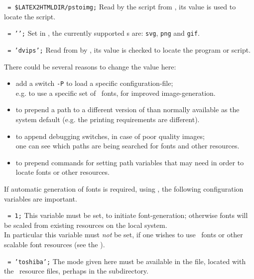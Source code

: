\begin{htmllist}
\item [\fn{\$PSTOIMG}\texttt{ = \char34\$LATEX2HTMLDIR/pstoimg\char34;}]
Read by the  \Perl{} script from , 
its value is used to locate the  \Perl{} script.

\item [\fn{\$IMAGE\_TYPE}\texttt{ = '\Meta{image-type}';}]
Set in , the currently supported s
are: \texttt{svg}, \texttt{png} and \texttt{gif}.

\item [\fn{\$DVIPS}\texttt{ = 'dvips';}]
Read from  by , 
its value is checked to locate the  program or script.

\smallskip\noindent
There could be several reasons to change the value here:
\begin{itemize}
\item
add a switch \texttt{-P} to load a specific configuration-file;\\
e.g. to use a specific set of \PS\ fonts, for improved image-generation.
\item
to prepend a path to a different version of  than normally
available as the system default (e.g. the printing requirements are different).
\item
to append debugging switches, in case of poor quality images;\\
one can see which paths are being searched for fonts and other resources.
\item
to prepend commands for setting path variables that  may need
in order to locate fonts or other resources.
\end{itemize}

If automatic generation of fonts is required, using \MF, the following
configuration variables are important.
%
\begin{htmllist}%
%
\item [\fn{\$PK\_GENERATION}\texttt{ = 1;}\label{pkgen}]
This variable must be set, to initiate font-generation; otherwise fonts
will be scaled from existing resources on the local system.\\
In particular this variable must \emph{not} be set, if one wishes to use
\PS\ fonts or other scalable font resources 
(see the  ).

\item [\fn{\$DVIPS\_MODE}\texttt{ = 'toshiba';}]
The mode given here must be available in the  file,
located with the \MF\ resource files, perhaps in the  subdirectory.


\end{htmllist}
\end{htmllist}
